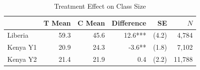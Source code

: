 \begin{table}[htbp]
\centering\small
\caption{Treatment Effect on Class Size}
\label{tab:classsize_effect}
\begin{tabular}{lrrrrr}
\toprule
 & T Mean & C Mean & Difference & SE & $N$ \\
\midrule
Liberia & 59.3 & 45.6 & 12.6*** & (4.2) & 4,784 \\
Kenya Y1 & 20.9 & 24.3 & -3.6** & (1.8) & 7,102 \\
Kenya Y2 & 21.4 & 21.9 & 0.4 & (2.2) & 11,788 \\
\bottomrule
\end{tabular}
\par\smallskip{}
\end{table}